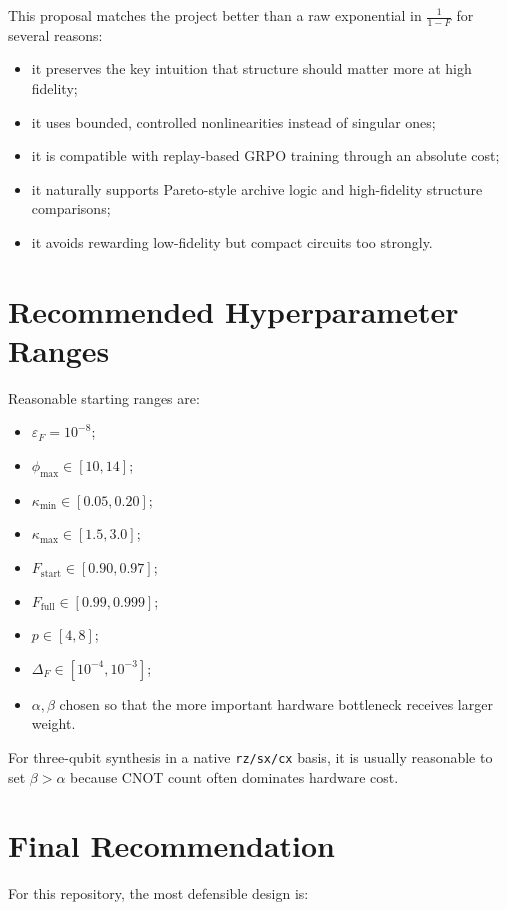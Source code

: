 \documentclass[11pt]{article}
\begin{document}
This proposal matches the project better than a raw exponential in $\frac{1}{1-F}$ for several reasons:

\begin{itemize}[leftmargin=*]
\item it preserves the key intuition that structure should matter more at high fidelity;
\item it uses bounded, controlled nonlinearities instead of singular ones;
\item it is compatible with replay-based GRPO training through an absolute cost;
\item it naturally supports Pareto-style archive logic and high-fidelity structure comparisons;
\item it avoids rewarding low-fidelity but compact circuits too strongly.
\end{itemize}

\section{Recommended Hyperparameter Ranges}

Reasonable starting ranges are:

\begin{itemize}[leftmargin=*]
\item $\varepsilon_F = 10^{-8}$;
\item $\phi_{\max} \in [10,14]$;
\item $\kappa_{\min} \in [0.05,0.20]$;
\item $\kappa_{\max} \in [1.5,3.0]$;
\item $F_{\mathrm{start}} \in [0.90,0.97]$;
\item $F_{\mathrm{full}} \in [0.99,0.999]$;
\item $p \in [4,8]$;
\item $\Delta_F \in [10^{-4},10^{-3}]$;
\item $\alpha,\beta$ chosen so that the more important hardware bottleneck receives larger weight.
\end{itemize}

For three-qubit synthesis in a native \texttt{rz/sx/cx} basis, it is usually reasonable to set
$\beta > \alpha$ because CNOT count often dominates hardware cost.

\section{Final Recommendation}

For this repository, the most defensible design is:
\end{document}
